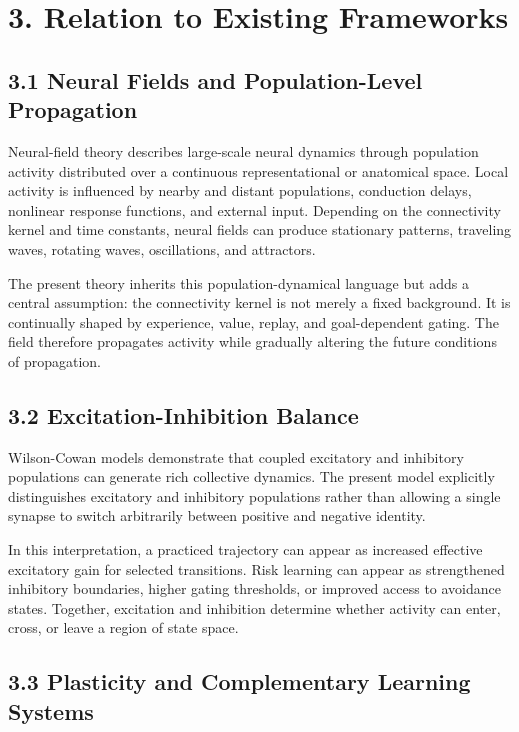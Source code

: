 \documentclass[11pt, a4paper]{article}
\begin{document}
\section{3. Relation to Existing Frameworks}

\subsection{3.1 Neural Fields and Population-Level Propagation}

Neural-field theory describes large-scale neural dynamics through population activity distributed over a continuous representational or anatomical space. Local activity is influenced by nearby and distant populations, conduction delays, nonlinear response functions, and external input. Depending on the connectivity kernel and time constants, neural fields can produce stationary patterns, traveling waves, rotating waves, oscillations, and attractors.

The present theory inherits this population-dynamical language but adds a central assumption: the connectivity kernel is not merely a fixed background. It is continually shaped by experience, value, replay, and goal-dependent gating. The field therefore propagates activity while gradually altering the future conditions of propagation.

\subsection{3.2 Excitation-Inhibition Balance}

Wilson-Cowan models demonstrate that coupled excitatory and inhibitory populations can generate rich collective dynamics. The present model explicitly distinguishes excitatory and inhibitory populations rather than allowing a single synapse to switch arbitrarily between positive and negative identity.

In this interpretation, a practiced trajectory can appear as increased effective excitatory gain for selected transitions. Risk learning can appear as strengthened inhibitory boundaries, higher gating thresholds, or improved access to avoidance states. Together, excitation and inhibition determine whether activity can enter, cross, or leave a region of state space.

\subsection{3.3 Plasticity and Complementary Learning Systems}
\end{document}
